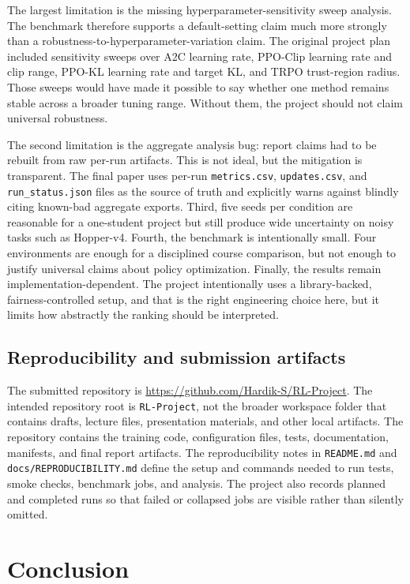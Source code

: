 \documentclass{article}
\begin{document}
The largest limitation is the missing hyperparameter-sensitivity sweep analysis. The benchmark therefore supports a default-setting claim much more strongly than a robustness-to-hyperparameter-variation claim. The original project plan included sensitivity sweeps over A2C learning rate, PPO-Clip learning rate and clip range, PPO-KL learning rate and target KL, and TRPO trust-region radius. Those sweeps would have made it possible to say whether one method remains stable across a broader tuning range. Without them, the project should not claim universal robustness.

The second limitation is the aggregate analysis bug: report claims had to be rebuilt from raw per-run artifacts. This is not ideal, but the mitigation is transparent. The final paper uses per-run \texttt{metrics.csv}, \texttt{updates.csv}, and \texttt{run\_status.json} files as the source of truth and explicitly warns against blindly citing known-bad aggregate exports. Third, five seeds per condition are reasonable for a one-student project but still produce wide uncertainty on noisy tasks such as Hopper-v4. Fourth, the benchmark is intentionally small. Four environments are enough for a disciplined course comparison, but not enough to justify universal claims about policy optimization. Finally, the results remain implementation-dependent. The project intentionally uses a library-backed, fairness-controlled setup, and that is the right engineering choice here, but it limits how abstractly the ranking should be interpreted.

\subsection{Reproducibility and submission artifacts}

The submitted repository is \url{https://github.com/Hardik-S/RL-Project}. The intended repository root is \texttt{RL-Project}, not the broader workspace folder that contains drafts, lecture files, presentation materials, and other local artifacts. The repository contains the training code, configuration files, tests, documentation, manifests, and final report artifacts. The reproducibility notes in \texttt{README.md} and \texttt{docs/REPRODUCIBILITY.md} define the setup and commands needed to run tests, smoke checks, benchmark jobs, and analysis. The project also records planned and completed runs so that failed or collapsed jobs are visible rather than silently omitted.

\section{Conclusion}
\end{document}
